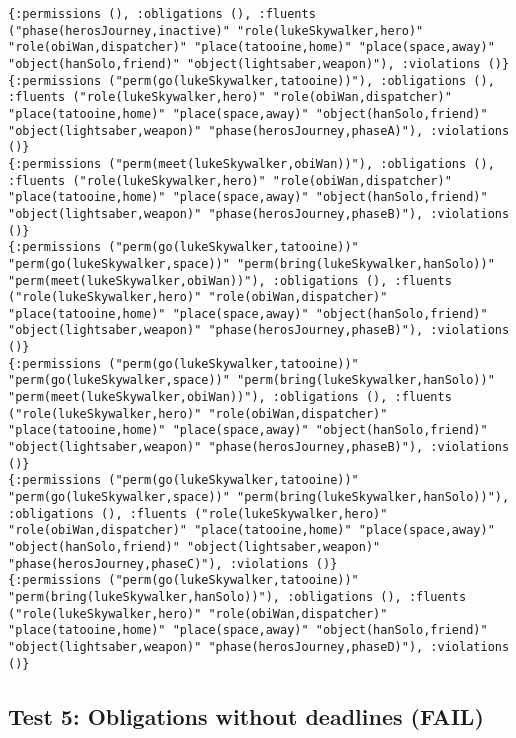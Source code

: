 \documentclass[11pt]{article}
\begin{document}
\begin{verbatim}
{:permissions (), :obligations (), :fluents ("phase(herosJourney,inactive)" "role(lukeSkywalker,hero)" "role(obiWan,dispatcher)" "place(tatooine,home)" "place(space,away)" "object(hanSolo,friend)" "object(lightsaber,weapon)"), :violations ()}
{:permissions ("perm(go(lukeSkywalker,tatooine))"), :obligations (), :fluents ("role(lukeSkywalker,hero)" "role(obiWan,dispatcher)" "place(tatooine,home)" "place(space,away)" "object(hanSolo,friend)" "object(lightsaber,weapon)" "phase(herosJourney,phaseA)"), :violations ()}
{:permissions ("perm(meet(lukeSkywalker,obiWan))"), :obligations (), :fluents ("role(lukeSkywalker,hero)" "role(obiWan,dispatcher)" "place(tatooine,home)" "place(space,away)" "object(hanSolo,friend)" "object(lightsaber,weapon)" "phase(herosJourney,phaseB)"), :violations ()}
{:permissions ("perm(go(lukeSkywalker,tatooine))" "perm(go(lukeSkywalker,space))" "perm(bring(lukeSkywalker,hanSolo))" "perm(meet(lukeSkywalker,obiWan))"), :obligations (), :fluents ("role(lukeSkywalker,hero)" "role(obiWan,dispatcher)" "place(tatooine,home)" "place(space,away)" "object(hanSolo,friend)" "object(lightsaber,weapon)" "phase(herosJourney,phaseB)"), :violations ()}
{:permissions ("perm(go(lukeSkywalker,tatooine))" "perm(go(lukeSkywalker,space))" "perm(bring(lukeSkywalker,hanSolo))" "perm(meet(lukeSkywalker,obiWan))"), :obligations (), :fluents ("role(lukeSkywalker,hero)" "role(obiWan,dispatcher)" "place(tatooine,home)" "place(space,away)" "object(hanSolo,friend)" "object(lightsaber,weapon)" "phase(herosJourney,phaseB)"), :violations ()}
{:permissions ("perm(go(lukeSkywalker,tatooine))" "perm(go(lukeSkywalker,space))" "perm(bring(lukeSkywalker,hanSolo))"), :obligations (), :fluents ("role(lukeSkywalker,hero)" "role(obiWan,dispatcher)" "place(tatooine,home)" "place(space,away)" "object(hanSolo,friend)" "object(lightsaber,weapon)" "phase(herosJourney,phaseC)"), :violations ()}
{:permissions ("perm(go(lukeSkywalker,tatooine))" "perm(bring(lukeSkywalker,hanSolo))"), :obligations (), :fluents ("role(lukeSkywalker,hero)" "role(obiWan,dispatcher)" "place(tatooine,home)" "place(space,away)" "object(hanSolo,friend)" "object(lightsaber,weapon)" "phase(herosJourney,phaseD)"), :violations ()}
\end{verbatim}

\subsection{Test 5: Obligations without deadlines (FAIL)}
\label{sec:orgheadline5}
\end{document}

